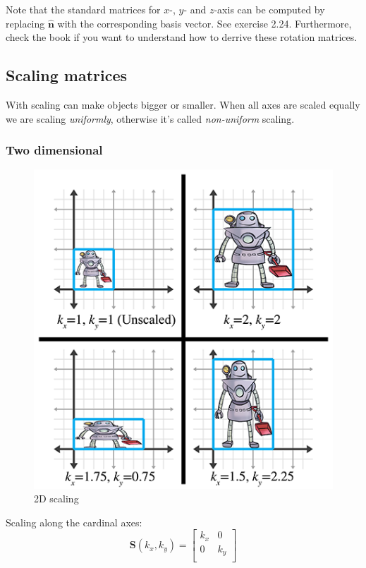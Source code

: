 \documentclass[11pt]{article}
\begin{document}
Note that the standard matrices for $x$-, $y$- and $z$-axis can be computed by replacing $\hat{\textbf{n}}$ with the corresponding basis vector. See exercise 2.24. Furthermore, check the book if you want to understand how to derrive these rotation matrices.

\subsection{Scaling matrices}

With scaling can make objects bigger or smaller. When all axes are scaled equally we are scaling \textit{uniformly}, otherwise it's called \textit{non-uniform} scaling.

\subsubsection{Two dimensional}

\begin{figure}[H]
\centering
    \includegraphics{05_scaling}
\caption{2D scaling}
\label{fig:2d-scaling}
\end{figure}

Scaling along the cardinal axes: \\
$$
\mathbf{S}(k_{x},k_{y}) =
\begin{bmatrix}
k_{x} & 0 \\
0 & k_{y} \\
\end{bmatrix}
$$
\end{document}
